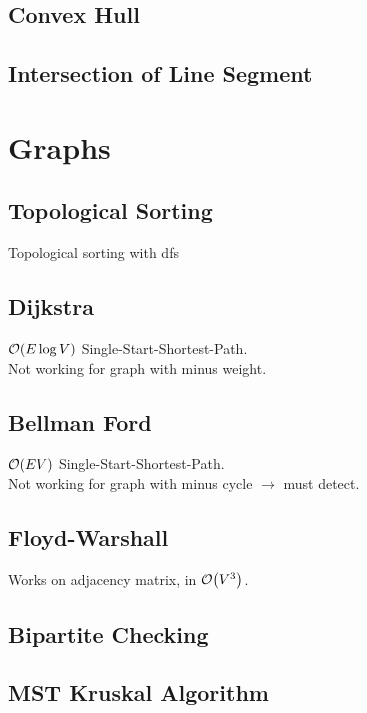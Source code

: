 \documentclass[landscape,8pt]{article}
\begin{document}
\begin{multicols}{2}
  \subsection{Convex Hull}

  \subsection{Intersection of Line Segment}

\columnbreak
\section{Graphs}
  \subsection{Topological Sorting}
  Topological sorting with dfs
    

  \subsection{Dijkstra}
  $\order{E \log V}$ Single-Start-Shortest-Path.\\
  Not working for graph with minus weight.
    

  \subsection{Bellman Ford}
  $\order{EV}$ Single-Start-Shortest-Path.\\
  Not working for graph with minus cycle $\rightarrow$ must detect.
    

  \subsection{Floyd-Warshall}
  Works on adjacency matrix, in $\order{V^3}$.
  

  \subsection{Bipartite Checking}
  
  \subsection{MST Kruskal Algorithm}


\end{multicols}
\end{document}
